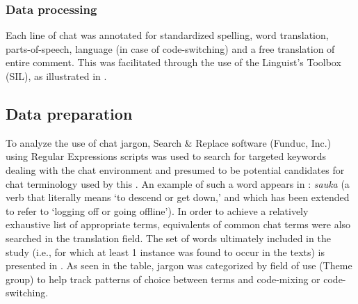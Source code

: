 \documentclass[output=paper,newtxmath,modfonts,nonflat,hidelinks]{langsci/langscibook}
\begin{document}
  
\subsubsection{Data processing}

Each line of chat was annotated for standardized spelling, word translation, parts-of-speech, language (in case of code-switching) and a free translation of entire comment. This was facilitated through the use of the Linguist’s Toolbox (SIL), as illustrated in .

 

 

\subsection{Data preparation}

To analyze the use of chat jargon, Search \& Replace software (Funduc, Inc.) using Regular Expressions scripts was used to search for targeted keywords dealing with the chat environment and presumed to be potential candidates for chat terminology used by this . An example of such a word appears in : \textit{sauka} (a  verb that literally means ‘to descend or get down,’ and which has been extended to refer to ‘logging off or going offline’). In order to achieve a relatively exhaustive list of appropriate terms,  equivalents of common chat terms were also searched in the translation field. The set of words ultimately included in the study (i.e., for which at least 1 instance was found to occur in the texts) is presented in . As seen in the table, jargon was categorized by field of use (Theme group) to help track patterns of choice between  terms and  code-mixing or code-switching. 
\end{document}
